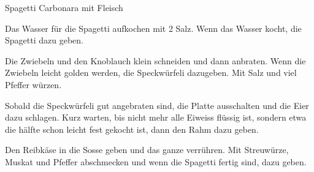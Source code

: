 
\begin{recipe}[]{Spagetti Carbonara mit Fleisch}{}{}



\step
Das Wasser f\"ur die Spagetti aufkochen mit 2 \EL Salz. Wenn das Wasser kocht, die Spagetti dazu geben.

\step
Die Zwiebeln und den Knoblauch klein schneiden und dann anbraten. Wenn die Zwiebeln leicht golden werden, die Speckw\"urfeli dazugeben. Mit Salz und viel Pfeffer w\"urzen.

\step
Sobald die Speckw\"urfeli gut angebraten sind, die Platte ausschalten und die Eier dazu schlagen. Kurz warten, bis nicht mehr alle Eiweiss fl\"ussig ist, sondern etwa die h\"alfte schon leicht fest gekocht ist, dann den Rahm dazu geben.

\step
Den Reibk\"ase in die Sosse geben und das ganze verr\"uhren. Mit Streuw\"urze, Muskat und Pfeffer abschmecken und wenn die Spagetti fertig sind, dazu geben.


\end{recipe}